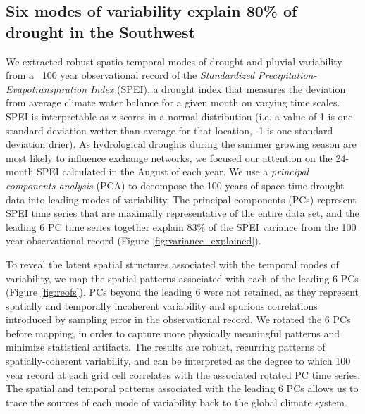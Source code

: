 \documentclass[fleqn,10pt]{wlscirep}
\begin{document}
\subsection*{Six modes of variability explain 80\% of drought in the Southwest}
We extracted robust spatio-temporal modes of drought and pluvial variability from a ~100 year observational record of the \textit{Standardized Precipitation-Evapotranspiration Index} (SPEI), a drought index that measures the deviation from average climate water balance for a given month on varying time scales. SPEI is interpretable as z-scores in a normal distribution (i.e. a value of 1 is one standard deviation wetter than average for that location, -1 is one standard deviation drier). As hydrological droughts during the summer growing season are most likely to influence exchange networks, we focused our attention on the 24-month SPEI calculated in the August of each year. We use a \textit{principal components analysis} (PCA) to decompose the 100 years of space-time drought data into leading modes of variability. The principal components (PCs) represent SPEI time series that are maximally representative of the entire data set, and the leading 6 PC time series together explain 83\% of the SPEI variance from the 100 year observational record (Figure \ref{fig:variance_explained}). 

To reveal the latent spatial structures associated with the temporal modes of variability, we map the spatial patterns associated with each of the leading 6 PCs (Figure \ref{fig:reofs}). PCs beyond the leading 6 were not retained, as they represent spatially and temporally incoherent variability and spurious correlations introduced by sampling error in the observational record. We rotated the 6 PCs before mapping, in order to capture more physically meaningful patterns and minimize statistical artifacts. The results are robust, recurring patterns of spatially-coherent variability, and can be interpreted as the degree to which 100 year record at each grid cell correlates with the associated rotated PC time series. The spatial and temporal patterns associated with the leading 6 PCs allows us to trace the sources of each mode of variability back to the global climate system.
\end{document}
